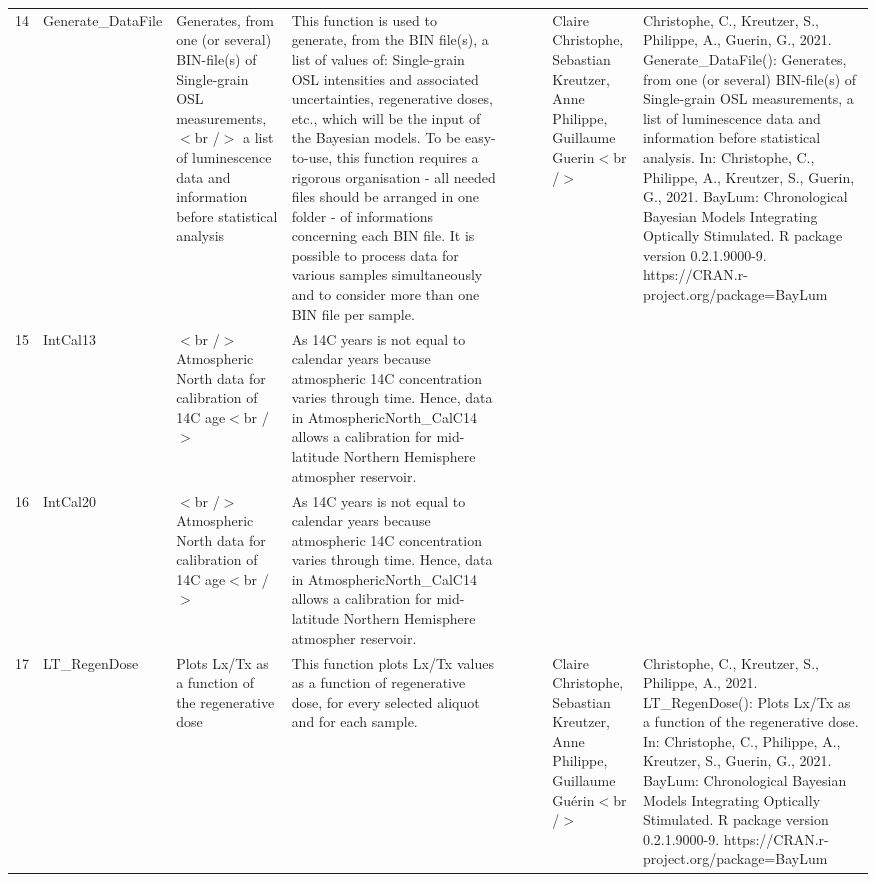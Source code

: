\begin{table}[ht]
\begin{tabular}{rllllllll}
 \\ 
  14 & Generate\_DataFile & Generates, from one (or several) BIN-file(s) of Single-grain OSL measurements,$<$br /$>$ a list of luminescence data and information before statistical analysis & This function is used to generate, from the BIN file(s), a list of values of: Single-grain  OSL intensities and associated uncertainties, regenerative doses, etc., which will be the input of the Bayesian models. To be easy-to-use, this function requires a rigorous organisation - all needed files should be arranged in one folder - of informations concerning each BIN file.   It is possible to process data for various samples simultaneously and to consider more than one BIN file per sample. &  &  &  & Claire Christophe, Sebastian Kreutzer, Anne Philippe, Guillaume Guerin$<$br /$>$ & Christophe, C., Kreutzer, S., Philippe, A., Guerin, G., 2021. Generate\_DataFile(): Generates, from one (or several) BIN-file(s) of Single-grain OSL measurements, a list of luminescence data and information before statistical analysis. In: Christophe, C., Philippe, A., Kreutzer, S., Guerin, G., 2021. BayLum: Chronological Bayesian Models Integrating Optically Stimulated. R package version 0.2.1.9000-9. https://CRAN.r-project.org/package=BayLum
 \\ 
  15 & IntCal13 & $<$br /$>$ Atmospheric North data for calibration of 14C age$<$br /$>$ & As 14C years is not equal to calendar years because atmospheric 14C concentration varies through time. Hence, data in AtmosphericNorth\_CalC14 allows a calibration for mid-latitude Northern Hemisphere atmospher reservoir. &  &  &  &  &  \\ 
  16 & IntCal20 & $<$br /$>$ Atmospheric North data for calibration of 14C age$<$br /$>$ & As 14C years is not equal to calendar years because atmospheric 14C concentration varies through time. Hence, data in AtmosphericNorth\_CalC14 allows a calibration for mid-latitude Northern Hemisphere atmospher reservoir. &  &  &  &  &  \\ 
  17 & LT\_RegenDose & Plots Lx/Tx as a function of the regenerative dose & This function plots  Lx/Tx  values as a function of regenerative dose, for every selected aliquot and for each sample. &  &  &  & Claire Christophe, Sebastian Kreutzer, Anne Philippe, Guillaume Guérin$<$br /$>$ & Christophe, C., Kreutzer, S., Philippe, A., 2021. LT\_RegenDose(): Plots Lx/Tx as a function of the regenerative dose. In: Christophe, C., Philippe, A., Kreutzer, S., Guerin, G., 2021. BayLum: Chronological Bayesian Models Integrating Optically Stimulated. R package version 0.2.1.9000-9. https://CRAN.r-project.org/package=BayLum

\end{tabular}
\end{table}
